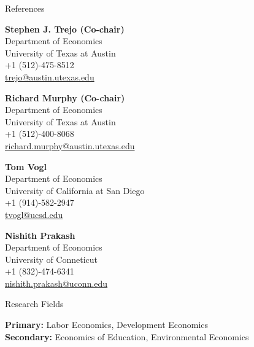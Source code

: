 \documentclass{resume} %
\begin{document}
\begin{rSection}{References}
\begin{minipage}{0.5\linewidth}
{\bf Stephen J. Trejo (Co-chair)}\\
Department of Economics\\
University of Texas at Austin\\
+1 (512)-475-8512\\
\href{mailto:trejo@austin.utexas.edu}{trejo@austin.utexas.edu}\\
\end{minipage}
\hfill
\begin{minipage}{0.5\linewidth}
{\bf Richard Murphy (Co-chair)} \\
Department of Economics\\
University of Texas at Austin\\
+1 (512)-400-8068\\
\href{mailto:richard.murphy@austin.utexas.edu}{richard.murphy@austin.utexas.edu}\\
\end{minipage}

\begin{minipage}{0.5\linewidth}
{\bf Tom Vogl}\\
Department of Economics\\
University of California at San Diego\\
+1 (914)-582-2947\\
\href{mailto:tvogl@ucsd.edu}{tvogl@ucsd.edu}\\
\end{minipage}
\hfill
\begin{minipage}{0.5\linewidth}
{\bf Nishith Prakash} \\
Department of Economics\\
University of Conneticut\\
+1 (832)-474-6341\\
\href{mailto:nishith.prakash@uconn.edu}{nishith.prakash@uconn.edu}\\
\end{minipage}

\end{rSection}


\begin{rSection}{Research Fields}\itemsep -2pt

{\bf Primary:} Labor Economics, Development Economics\\
{\bf Secondary:} Economics of Education, Environmental Economics

\end{rSection}
\end{document}
